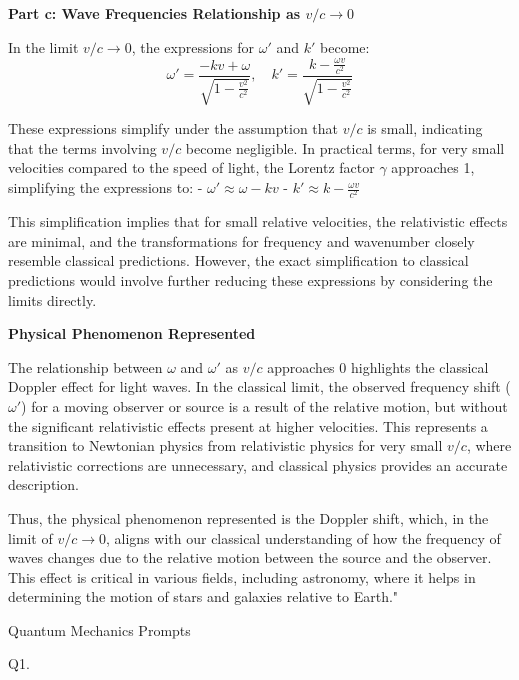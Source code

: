 \textbf{Part c: Wave Frequencies Relationship as \( v/c \rightarrow 0 \)}

In the limit \( v/c \rightarrow 0 \), the expressions for \( \omega' \) and \( k' \) become:
\[
\omega' = \frac{-kv + \omega}{\sqrt{1 - \frac{v^2}{c^2}}}, \quad k' = \frac{k - \frac{\omega v}{c^2}}{\sqrt{1 - \frac{v^2}{c^2}}}
\]

These expressions simplify under the assumption that \( v/c \) is small, indicating that the terms involving \( v/c \) become negligible. In practical terms, for very small velocities compared to the speed of light, the Lorentz factor \( \gamma \) approaches 1, simplifying the expressions to:
- \( \omega' \approx \omega - kv \)
- \( k' \approx k - \frac{\omega v}{c^2} \)

This simplification implies that for small relative velocities, the relativistic effects are minimal, and the transformations for frequency and wavenumber closely resemble classical predictions. However, the exact simplification to classical predictions would involve further reducing these expressions by considering the limits directly.

\textbf{Physical Phenomenon Represented}

The relationship between \( \omega \) and \( \omega' \) as \( v/c \) approaches 0 highlights the classical Doppler effect for light waves. In the classical limit, the observed frequency shift (\( \omega' \)) for a moving observer or source is a result of the relative motion, but without the significant relativistic effects present at higher velocities. This represents a transition to Newtonian physics from relativistic physics for very small \( v/c \), where relativistic corrections are unnecessary, and classical physics provides an accurate description.

Thus, the physical phenomenon represented is the Doppler shift, which, in the limit of \( v/c \rightarrow 0 \), aligns with our classical understanding of how the frequency of waves changes due to the relative motion between the source and the observer. This effect is critical in various fields, including astronomy, where it helps in determining the motion of stars and galaxies relative to Earth."




Quantum Mechanics Prompts

                           Q1. 

